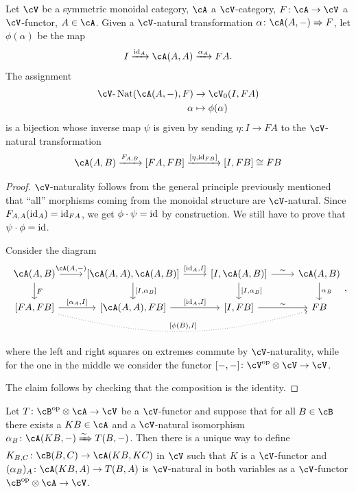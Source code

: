 \documentclass[a4paper,11pt,oneside,openany]{scrbook}
\begin{document}
\begin{thm}
	Let $\cV$ be a symmetric monoidal category, $\cA$ a $\cV$-category,
    $F\colon\cA\rightarrow\cV$ a $\cV$-functor, $A\in\cA$. Given a $\cV$-natural
    transformation $\alpha\colon\cA(A,-)\Rightarrow F$, let $\phi(\alpha)$ be
    the map$$I\xrightarrow{\id_A}\cA(A,A)\xrightarrow{\alpha_A}FA.$$
	The assignment
	\begin{align*}
        \cV\text{-}\Nat(\cA(A,-),F) & \rightarrow\cV_0(I,FA) \\
		\alpha                                     & \mapsto\phi(\alpha)
	\end{align*}
	is a bijection whose inverse map $\psi$ is given by sending $\eta\colon
    I\rightarrow FA$ to the $\cV$-natural transformation
	$$\cA(A,B)\xrightarrow{F_{A,B}}[FA,FB]\xrightarrow{[\eta,\id_{FB}]}[I,FB]\cong FB$$
\end{thm}

\begin{proof}
	$\cV$-naturality follows from the general principle previously mentioned
    that ``all'' morphisms coming from the monoidal structure are $\cV$-natural.
    Since $F_{A,A}(\operatorname{id}_A)=\operatorname{id}_{FA}$, we get $\phi\cdot\psi=\operatorname{id}$ by construction.
    We still have to prove that $\psi\cdot\phi=\operatorname{id}$.

	Consider the diagram
	\[
		\begin{tikzcd}
			\cA(A,B)\ar[r, "{\cA(A,-)}"]\ar[d, "F"]
			& {[\cA(A,A),\cA(A,B)]}\ar[r, "{[\id_A,I]}"]\ar[d, "{[I,\alpha_B]}"]
			& {[I,\cA(A,B)]}\ar[r, "\sim"]\ar[d, "{[I,\alpha_B]}"]
			& \cA(A,B)\ar[d, "\alpha_B"] \\
			{[FA,FB]}\ar[r, "{[\alpha_A,I]}"]\ar[rrr, bend right=15, dotted, "{[\phi(B),I]}"]
			& {[\cA(A,A),FB]}\ar[r, "{[\id_A,I]}"]
			& {[I,FB]}\ar[r, "\sim"]
			& FB
		\end{tikzcd}
		,\]
	where the left and right squares on extremes commute by $\cV$-naturality, while for the one in the middle we consider the functor $[-,-]\colon\cV^{\op}\otimes\cV\rightarrow\cV$.

	The claim follows by checking that the composition is the identity.
\end{proof}

\begin{thm}
	Let $T\colon\cB^{\op}\otimes\cA\rightarrow\cV$ be a $\cV$-functor and suppose that for all $B\in\cB$ there exists a $KB\in\cA$ and a $\cV$-natural isomorphism $\alpha_B\colon\cA(KB,-)\xRightarrow{\sim} T(B,-)$. Then there is a unique way to define $K_{B,C}\colon\cB(B,C)\rightarrow\cA(KB,KC)$ in $\cV$ such that $K$ is a $\cV$-functor and $(\alpha_B)_A\colon\cA(KB,A)\rightarrow T(B,A)$ is $\cV$-natural in both variables as a $\cV$-functor $\cB^{\op}\otimes\cA\rightarrow\cV$.
\end{thm}
\end{document}
